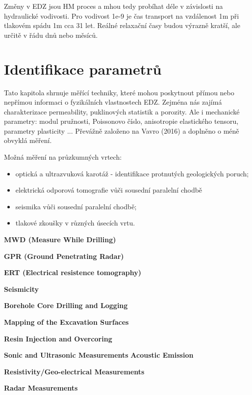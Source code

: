 \documentclass{article}
\begin{document}
Změny v EDZ jsou HM proces a mhou tedy probíhat déle v závislosti na hydraulické vodivosti. Pro vodivost 1e-9 je čas transport na vzdálenost 1m při tlakovém spádu 1m cca 31 let. Reálné relaxační časy budou výrazně kratší, ale určitě v řádu dnů nebo měsíců. 

\section{Identifikace parametrů}
\label{sec:parameters}

Tato kapitola shrnuje měřící techniky, které mohou poskytnout přímou nebo nepřímou informaci 
o fyzikálních vlastnostech EDZ. Zejména nás zajímá charakterizace permeability, puklinových statistik a porozity. Ale i mechanické parametry: modul pružnosti, Poissonovo číslo, anisotropie elastického tensoru,  parametry plasticity ...
Převážně založeno na Vavro (2016) \cite{Vavro2016} a doplněno o méně obvyklá měření.


Možná měření na průzkumných vrtech:
    \begin{itemize}
        \item optická a ultrazvuková karotáž - identifikace protnutých geologických poruch;
        \item elektrická odporová tomografie vůči sousední paralelní chodbě
        \item seismika vůči sousední paralelní chodbě;
        \item tlakové zkoušky v různých úsecích vrtu.
    \end{itemize}

{\bf MWD (Measure While Drilling)} \cite{JeroenvanEldert2018}

{\bf GPR (Ground Penetrating Radar)} 

{\bf ERT (Electrical resistence tomography)}


{\bf Seismicity}

{\bf  Borehole Core Drilling and Logging} \cite{Lanyon2011}

{\bf Mapping of the Excavation Surfaces} \cite{Lanyon2011}

{\bf  Resin Injection and Overcoring} \cite{Lanyon2011}

{\bf  Sonic and Ultrasonic Measurements} \cite{Lanyon2011}
{\bf  Acoustic Emission} \cite{Lanyon2011}

{\bf  Resistivity/Geo-electrical Measurements} \cite{Lanyon2011}

{\bf  Radar Measurements} \cite{Lanyon2011}
\end{document}
